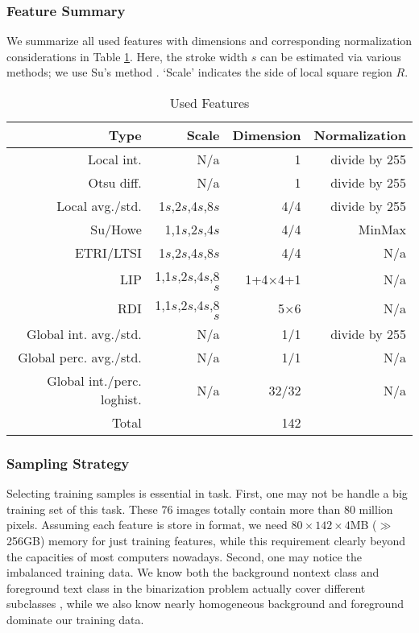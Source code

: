 \documentclass[onecolumn,11pt,draftcls,journal]{IEEEtran}
\begin{document}
\subsubsection{Feature Summary}
We summarize all used features with dimensions and corresponding normalization considerations in Table \ref{tab.feat}. Here, the stroke width $s$ can be estimated via various methods; we use Su's method \cite{Su2013}. `Scale' indicates the side of local square region $R$. 
\begin{table}[!h]
\centering
\scriptsize
\caption{Used Features }\label{tab.feat}
\begin{tabular}{rrrr}
\hline
\bf{Type}&\bf{Scale}&\bf{Dimension}&\bf{Normalization}\\\hline
Local int.&N/a&1&divide by 255\\
Otsu diff.&N/a&1&divide by 255\\
Local avg./std.&1$s$,2$s$,4$s$,8$s$&4/4&divide by 255\\
Su/Howe&1,1$s$,2$s$,4$s$&4/4&MinMax\\
ETRI/LTSI&1$s$,2$s$,4$s$,8$s$&4/4&N/a\\
LIP&1,1$s$,2$s$,4$s$,8$s$&1+4$\times$4+1&N/a\\
RDI&1,1$s$,2$s$,4$s$,8$s$&5$\times$6&N/a\\
Global int. avg./std.&N/a&1/1&divide by 255\\
Global perc. avg./std.&N/a&1/1&N/a\\
Global int./perc. loghist. &N/a&32/32&N/a\\\hline
Total& & 142 &\\
\hline
\end{tabular}
\end{table}


\subsubsection{Sampling Strategy}
Selecting training samples is essential in task. First, one may not be handle a big training set of this task. These 76 images totally contain more than 80 million pixels. Assuming each feature is store in {} format, we need $80\!\!\times \!\!142\!\!\times\!\!4$MB ($\gg$256GB) memory for just training features, while this requirement clearly beyond the capacities of most computers nowadays. Second, one may notice the imbalanced training data. We know both the background nontext class and foreground text class in the binarization problem actually cover different subclasses \cite{Su2012,ramirez2010transition}, while we also know nearly homogeneous background and foreground dominate our training data. 
\end{document}

